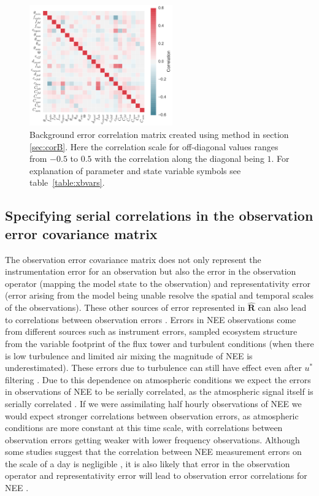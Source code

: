 \documentclass[review]{elsarticle}
\begin{document}
\begin{figure}[ht]
    \centering
    \includegraphics[width=0.55\textwidth]{bedccor2.pdf}
    \caption{Background error correlation matrix created using method in section \ref{sec:corB}. Here the correlation scale for off-diagonal values ranges from $-0.5$ to $0.5$ with the correlation along the diagonal being $1$. For explanation of parameter and state variable symbols see table~\ref{table:xbvars}.}
    \label{fig:Bcorr}
\end{figure}

\subsection{Specifying serial correlations in the observation error covariance matrix} \label{sec:corR}

The observation error covariance matrix does not only represent the instrumentation error for an observation but also the error in the observation operator (mapping the model state to the observation) and representativity error (error arising from the model being unable resolve the spatial and temporal scales of the observations). These other sources of error represented in $\hat{\textbf{R}}$ can also lead to correlations between observation errors \citep{Waller2014}. Errors in NEE observations come from different sources such as instrument errors, sampled ecosystem structure from the variable footprint of the flux tower and turbulent conditions (when there is low turbulence and limited air mixing the magnitude of NEE is underestimated). These errors due to turbulence can still have effect even after $u^{*}$ filtering \citep{Papale2006}. Due to this dependence on atmospheric conditions we expect the errors in observations of NEE to be serially correlated, as the atmospheric signal itself is serially correlated \citep{Daley1992}. If we were assimilating half hourly observations of NEE we would expect stronger correlations between observation errors, as atmospheric conditions are more constant at this time scale, with correlations between observation errors getting weaker with lower frequency observations. Although some studies suggest that the correlation between NEE measurement errors on the scale of a day is negligible \citep{lasslop:hal-00297973}, it is also likely that error in the observation operator and representativity error will lead to observation error correlations for NEE \citep{Waller2014}.
\end{document}
